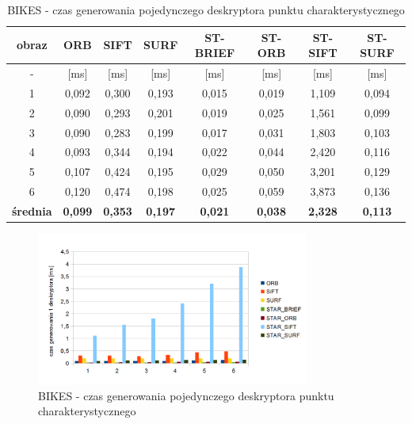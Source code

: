 \begin{table}[htbp]
  \centering
  \caption{BIKES - czas generowania pojedynczego deskryptora punktu charakterystycznego}
    \begin{tabular}{|c|c|c|c|c|c|c|c|}\hline

    obraz & \textbf{ORB} & \textbf{SIFT} & \textbf{SURF} & \textbf{ST-BRIEF} & \textbf{ST-ORB} & \textbf{ST-SIFT} & \textbf{ST-SURF} \\\hline

    - & [ms] & [ms] & [ms] & [ms] & [ms] & [ms] & [ms] \\\hline
    1 & 0,092 & 0,300 & 0,193 & 0,015 & 0,019 & 1,109 & 0,094 \\
    2 & 0,090 & 0,293 & 0,201 & 0,019 & 0,025 & 1,561 & 0,099 \\
    3 & 0,090 & 0,283 & 0,199 & 0,017 & 0,031 & 1,803 & 0,103 \\
    4 & 0,093 & 0,344 & 0,194 & 0,022 & 0,044 & 2,420 & 0,116 \\
    5 & 0,107 & 0,424 & 0,195 & 0,029 & 0,050 & 3,201 & 0,129 \\
    6 & 0,120 & 0,474 & 0,198 & 0,025 & 0,059 & 3,873 & 0,136 \\\hline
    \textbf{średnia} & \textbf{0,099} & \textbf{0,353} & \textbf{0,197} & \textbf{0,021} & \textbf{0,038} & \textbf{2,328} & \textbf{0,113} \\\hline
    

    \end{tabular}%
  \label{tab:bikes_f3}%
\end{table}%


\begin{figure}
\centering
\includegraphics[width=0.8\textwidth]{pict/mikolajczyk/bikes/f3.png}
\caption{BIKES - czas generowania pojedynczego deskryptora punktu charakterystycznego}
\label{fig:bikes_f3}
\end{figure}


